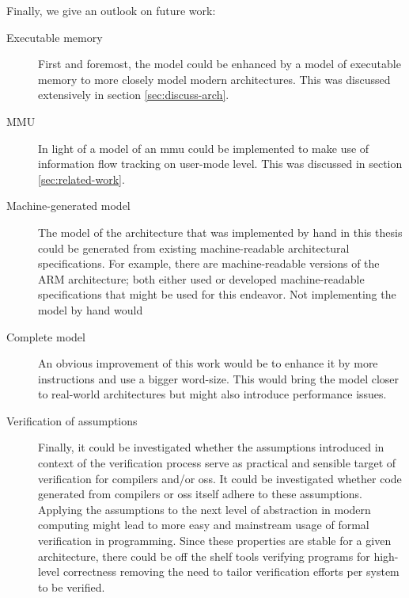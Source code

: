 Finally, we give an outlook on future work:
\begin{description}
    \item[Executable memory] First and foremost, the model could be enhanced by a model of executable memory to more closely model modern architectures.
    This was discussed extensively in section \ref{sec:discuss-arch}.
    \item[MMU] In light of \cite{KhakpourSD13} a model of an \gls{mmu} could be implemented to make use of information flow tracking on user-mode level.
    This was discussed in section \ref{sec:related-work}.
    \item[Machine-generated model]  The model of the architecture that was implemented by hand in this thesis could be generated from existing machine-readable architectural specifications.
    For example, there are machine-readable versions of the ARM architecture; both \cite{Reid17,Fox02} either used or developed machine-readable specifications that might be used for this endeavor.
    Not implementing the model by hand would 
    \item[Complete model] An obvious improvement of this work would be to enhance it by more instructions and use a bigger word-size.
    This would bring the model closer to real-world architectures but might also introduce performance issues.
    \item[Verification of assumptions] Finally, it could be investigated whether the assumptions introduced in context of the verification process serve as practical and sensible target of verification for compilers and/or \glspl{os}.
    It could be investigated whether code generated from compilers or \glspl{os} itself adhere to these assumptions.
    Applying the assumptions to the next level of abstraction in modern computing might lead to more easy and mainstream usage of formal verification in programming.
    Since these properties are stable for a given architecture, there could be off the shelf tools verifying programs for high-level correctness removing the need to tailor verification efforts per system to be verified.
\end{description}
